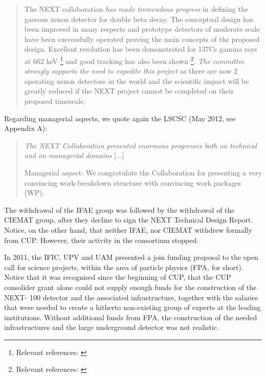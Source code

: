 \begin{quotation}
The NEXT collaboration {\em has made tremendous progress} in defining the gaseous xenon detector for double beta decay. The conceptual design has been improved in many respects and prototype detectors of moderate scale have been successfully operated proving the main concepts of the proposed design. Excellent resolution has been demonstrated for 137Cs gamma rays at 662 keV \footnote{Relevant references: \cite{Alvarez:2012yxw, Alvarez:2012zsz,Alvarez:2012hu,Alvarez:2013gxa,Lorca:2014sra}} and good tracking has also been shown \footnote{Relevant references:  \cite{Ferrario:2015kta}}. {\em The committee strongly supports the need to expedite this project} as there are now 2 operating xenon detectors in the world and the scientific impact will be greatly reduced if the NEXT project cannot be completed on their proposed timescale.
\end{quotation}

Regarding managerial aspects, we quote again the LSCSC (May 2012, see Appendix A):

\begin{quotation}
{\em The NEXT Collaboration presented enormous progresses both on technical and on managerial domains} [...]

Managerial aspect: We congratulate the Collaboration for presenting a very convincing work-breakdown structure with convincing work packages (WP).
\end{quotation}

The withdrawal of the IFAE group was followed by the withdrawal of the CIEMAT group, after they decline to sign the NEXT Technical Design Report.
%
Notice, on the other hand, that neither IFAE, nor CIEMAT withdrew formally from CUP. However, their activity in the consortium stopped. 

In 2011, the IFIC, UPV and UAM presented a join funding proposal to the open call for science projects, within the area of particle physics (FPA, for short). 
Notice that it was recognised since the beginning of CUP, that the CUP consolider grant alone could not supply  enough  funds for the construction of the NEXT- 100 detector and the associated infrastructure,
together with the salaries that were needed to create a hitherto non-existing group of experts at the leading institutions. Without additional funds from FPA, the construction of the needed infrastructures and the large underground detector was not realistic.

